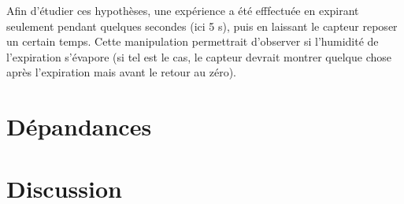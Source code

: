Afin d'étudier ces hypothèses, une expérience a été efffectuée en expirant seulement pendant quelques secondes (ici 5 s), puis en laissant le 
capteur reposer un certain temps. Cette manipulation permettrait d'observer si l'humidité de l'expiration s'évapore (si tel est le cas, le 
capteur devrait montrer quelque chose après l'expiration mais avant le retour au zéro). 

\section{Dépandances}
\section{Discussion}
